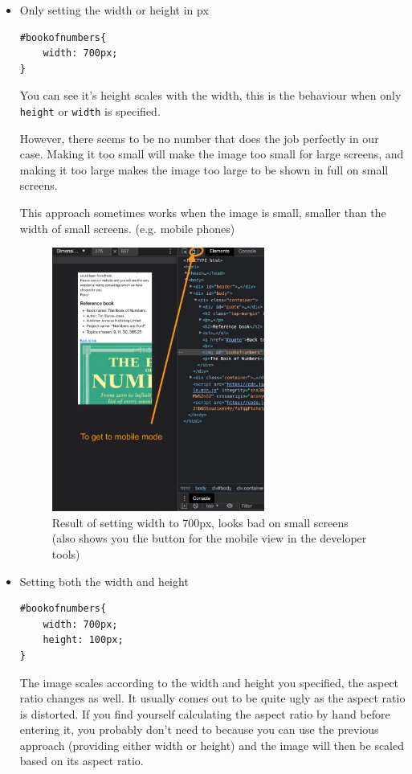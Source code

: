 \begin{itemize}
\item Only setting the width or height in px
    
\begin{lstlisting}[language=pug]
#bookofnumbers{
    width: 700px;
}
\end{lstlisting}

You can see it's height scales with the width, this is the behaviour when only \texttt{height} or \texttt{width} is specified.

However, there seems to be no number that does the job perfectly in our case. Making it too small will make the image too small for large screens, and making it too large makes the image too large to be shown in full on small screens. 

This approach sometimes works when the image is small, smaller than the width of small screens. (e.g. mobile phones)

\begin{figure}[h]
\centering
\includegraphics[width=7cm]{images/chn6-widthonly.png}
\caption{Result of setting width to 700px, looks bad on small screens (also shows you the button for the mobile view in the developer tools)}
\end{figure}

\item Setting both the width and height

\begin{lstlisting}[language=pug]
#bookofnumbers{
    width: 700px;
    height: 100px;
}
\end{lstlisting}

The image scales according to the width and height you specified, the aspect ratio changes as well. It usually comes out to be quite ugly as the aspect ratio is distorted. If you find yourself calculating the aspect ratio by hand before entering it, you probably don't need to because you can use the previous approach (providing either width or height) and the image will then be scaled based on its aspect ratio.


\end{itemize}
